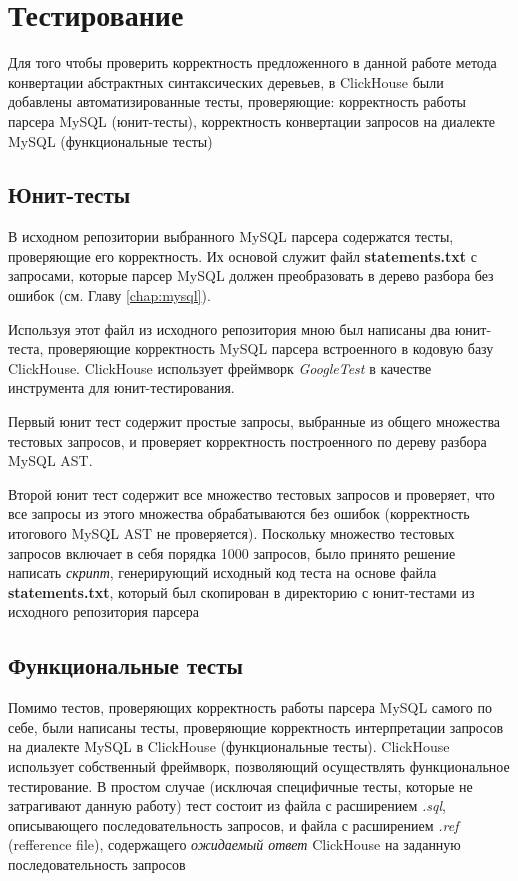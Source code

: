 \section{Тестирование} \label{chap:testing}
Для того чтобы проверить корректность предложенного в данной работе метода конвертации абстрактных синтаксических деревьев, в ClickHouse были добавлены автоматизированные тесты, проверяющие: корректность работы парсера MySQL (юнит-тесты), корректность конвертации запросов на диалекте MySQL (функциональные тесты)

\subsection{Юнит-тесты}
В исходном репозитории выбранного MySQL парсера содержатся тесты, проверяющие его корректность. Их основой служит файл \textbf{statements.txt} с запросами, которые парсер MySQL должен преобразовать в дерево разбора без ошибок (см. Главу \ref{chap:mysql}).

Используя этот файл из исходного репозитория мною был написаны два юнит-теста, проверяющие корректность MySQL парсера встроенного в кодовую базу ClickHouse. ClickHouse использует фреймворк \textit{GoogleTest} в качестве инструмента для юнит-тестирования.

Первый юнит тест содержит простые запросы, выбранные из общего множества тестовых запросов, и проверяет корректность построенного по дереву разбора MySQL AST.

Второй юнит тест содержит все множество тестовых запросов и проверяет, что все запросы из этого множества обрабатываются без ошибок (корректность итогового MySQL AST не проверяется). Поскольку множество тестовых запросов включает в себя порядка 1000 запросов, было принято решение написать \textit{скрипт}, генерирующий исходный код теста на основе файла \textbf{statements.txt}, который был скопирован в директорию с юнит-тестами из исходного репозитория парсера

\subsection{Функциональные тесты}
Помимо тестов, проверяющих корректность работы парсера MySQL самого по себе, были написаны тесты, проверяющие корректность интерпретации запросов на диалекте MySQL в ClickHouse (функциональные тесты). ClickHouse использует собственный фреймворк, позволяющий осуществлять функциональное тестирование. В простом случае (исключая специфичные тесты, которые не затрагивают данную работу) тест состоит из файла с расширением \textit{.sql}, описывающего последовательность запросов, и файла с расширением \textit{.ref} (refference file), содержащего \textit{ожидаемый ответ} ClickHouse на заданную последовательность запросов


